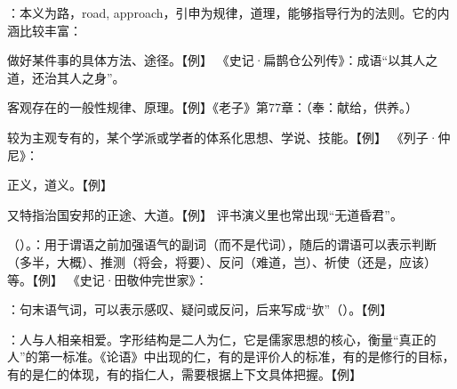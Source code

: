 {\item {}：本义为路，road, approach，引申为规律，道理，能够指导行为的法则。它的内涵比较丰富：
\begin{lyitemize}
\item 做好某件事的具体方法、途径。【例】 《史记·扁鹊仓公列传》：成语“以其人之道，还治其人之身”。
\item 客观存在的一般性规律、原理。【例】《老子》第77章：（奉：献给，供养。）
\item 较为主观专有的，某个学派或学者的体系化思想、学说、技能。【例】 《列子·仲尼》：
\item 正义，道义。【例】 
\item 又特指治国安邦的正途、大道。【例】 评书演义里也常出现“无道昏君”。
\end{lyitemize}
\item {}（）。：用于谓语之前加强语气的副词（而不是代词），随后的谓语可以表示判断（多半，大概）、推测（将会，将要）、反问（难道，岂）、祈使（还是，应该）等。【例】     《史记·田敬仲完世家》：

：句末语气词，可以表示感叹、疑问或反问，后来写成“欤”（）。【例】    

：人与人相亲相爱。字形结构是二人为仁，它是儒家思想的核心，衡量“真正的人”的第一标准。《论语》中出现的仁，有的是评价人的标准，有的是修行的目标，有的是仁的体现，有的指仁人，需要根据上下文具体把握。【例】     

}
